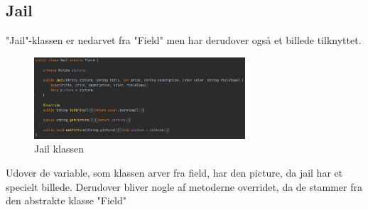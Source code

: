 \subsection{Jail}
"Jail"-klassen er nedarvet fra "Field" men har derudover også et billede tilknyttet.

\begin{figure}[H]
    \centering
    \includegraphics[width=0.7\textwidth]{sources/7_implementering/JailClass.png}
    \caption{Jail klassen}
    \label{fig:Jailklasse}
\end{figure}
Udover de variable, som klassen arver fra field, har den picture, da jail har et specielt billede. Derudover bliver nogle af metoderne overridet, da de stammer fra den abstrakte klasse "Field"